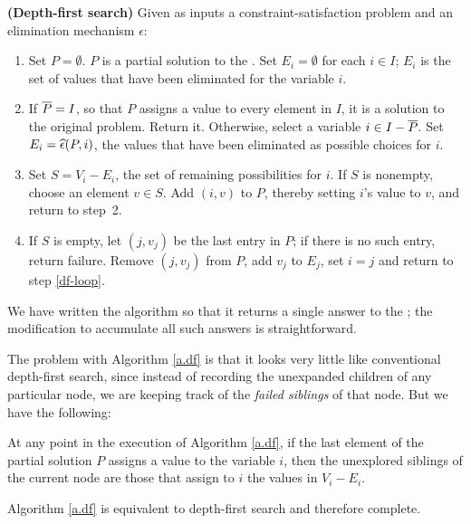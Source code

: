 \begin{algorithm} {\bf (Depth-first search)} Given as inputs a
constraint-satisfaction problem and an elimination mechanism
$\epsilon$:
 \begin{enumerate}
 \item Set $P=\emptyset$.  $P$ is a partial solution to the \csp.  Set
$E_i=\emptyset$ for each $i\in I$; $E_i$ is the set of values that
have been eliminated for the variable $i$.
 \item If $\overline P=I$, so that $P$ assigns a value to every element in
$I$, it is a solution to the original problem.  Return it.  Otherwise,
select a variable $i\in I-\overline P$.  Set $E_i=\widehat\epsilon(P,i)$, the values
that have been eliminated as possible choices for $i$.
 \item Set $S=V_i-E_i$, the set of remaining possibilities for $i$.
If $S$ is nonempty, choose an element $v\in S$.  Add $(i,v)$ to $P$,
thereby setting $i$'s value to $v$, and return to step~2.
\label{df-loop}
 \item If $S$ is empty, let $(j,v_j)$ be the last entry in $P$; if
there is no such entry, return failure.  Remove $(j,v_j)$ from $P$,
add $v_j$ to $E_j$, set $i=j$ and return to step \ref{df-loop}.
\label{df-backtrack}
 \end{enumerate}
 \label{a.df}
 \end{algorithm}

We have written the algorithm so that it returns a single answer to
the \csp; the modification to accumulate all such answers is
straightforward.

The problem with Algorithm \ref{a.df} is that it looks very little
like conventional depth-first search, since instead of recording the
unexpanded children of any particular node, we are keeping track of
the {\em failed siblings\/} of that node.  But we have the following:

\begin{lemma} At any point in the execution of Algorithm \ref{a.df},
if the last element of the partial solution $P$ assigns a value to the
variable $i$, then the unexplored siblings of the current node are
those that assign to $i$ the values in $V_i-E_i$.
 \label{l.df}
 \label{old.2}
 \end{lemma}

\begin{proposition} Algorithm \ref{a.df} is equivalent to depth-first
search and therefore complete.
 \label{old.3}
 \end{proposition}

